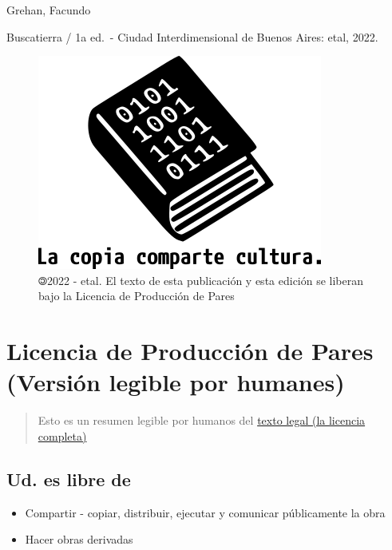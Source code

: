 \documentclass[
]{book}
\providecommand{\tightlist}{%
  \setlength{\itemsep}{0pt}\setlength{\parskip}{0pt}}
\begin{document}
Grehan, Facundo

Buscatierra / 1a ed.~- Ciudad Interdimensional de
Buenos Aires: etal, 2022.

\begin{figure}
\centering
\includegraphics{images/lccc.png}
\caption{🄯2022 - etal. El texto de esta publicación y esta edición se liberan bajo la Licencia de
Producción de Pares}
\end{figure}

\hypertarget{licencia-de-producciuxf3n-de-pares-versiuxf3n-legible-por-humanes}{%
\chapter*{Licencia de Producción de Pares (Versión legible por humanes)}\label{licencia-de-producciuxf3n-de-pares-versiuxf3n-legible-por-humanes}}

\begin{quote}
Esto es un resumen legible por humanos del \href{http://endefensadelsl.org/ppl_es.html}{texto legal (la licencia
completa)}
\end{quote}

\hypertarget{ud.-es-libre-de}{%
\section*{Ud. es libre de}\label{ud.-es-libre-de}}

\begin{itemize}
\tightlist
\item
  Compartir - copiar, distribuir, ejecutar y comunicar públicamente la obra
\item
  Hacer obras derivadas
\end{itemize}
\end{document}
